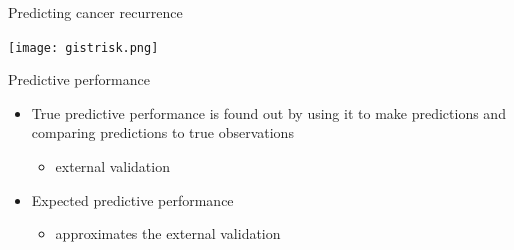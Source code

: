 \documentclass[english,t]{beamer}
\newenvironment{list1}{
   \begin{list}{$\color{list1}\bullet$}{\itemsep=6pt}}{
  \end{list}}
\newenvironment{list2}{
  \begin{list}{-}{\baselineskip=12pt\itemsep=2pt}}{
  \end{list}}
\begin{document}
\begin{frame}{Predicting cancer recurrence}

  \begin{center}
    \texttt{[image: gistrisk.png]}
  \end{center}
  
\end{frame}

\begin{frame}{Predictive performance}

  \begin{itemize}
  \item<1-> True predictive performance is found out by using it to make
    predictions and comparing predictions to true observations
    \begin{itemize}
      \item external validation
    \end{itemize}
  \item<2-> Expected predictive performance
    \begin{itemize}
      \item approximates the external validation
      \end{itemize}
    \end{itemize}

\end{frame}



  
\end{document}
